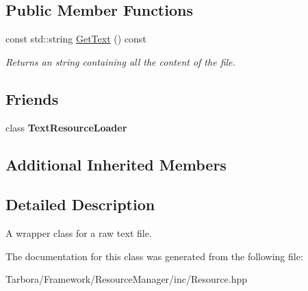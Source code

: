 \subsection*{Public Member Functions}
\begin{DoxyCompactItemize}
\item 
\mbox{\label{classTarbora_1_1Text_a196ccb63a134aabf6336c1ae17c3108e}} 
const std\+::string \hyperlink{classTarbora_1_1Text_a196ccb63a134aabf6336c1ae17c3108e}{Get\+Text} () const
\begin{DoxyCompactList}\small\item\em Returns an string containing all the content of the file. \end{DoxyCompactList}\end{DoxyCompactItemize}
\subsection*{Friends}
\begin{DoxyCompactItemize}
\item 
\mbox{\label{classTarbora_1_1Text_ad100d8767ed491d6e80636c2b83ac605}} 
class {\bfseries Text\+Resource\+Loader}
\end{DoxyCompactItemize}
\subsection*{Additional Inherited Members}


\subsection{Detailed Description}
A wrapper class for a raw text file. 

The documentation for this class was generated from the following file\+:\begin{DoxyCompactItemize}
\item 
Tarbora/\+Framework/\+Resource\+Manager/inc/Resource.\+hpp\end{DoxyCompactItemize}
